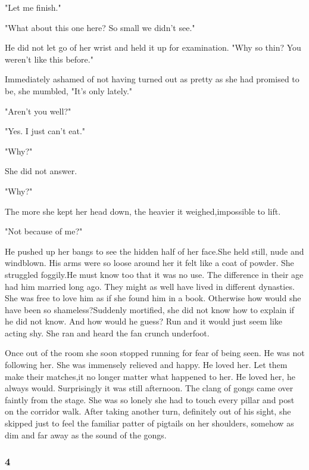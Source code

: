\par "Let me finish."
\par "What about this one here? So small we didn't see."
\par He did not let go of her wrist and held it up for examination. "Why so thin? You weren't like this before."
\par Immediately ashamed of not having turned out as pretty as she had promised to be, she mumbled, "It's only lately."
\par "Aren't you well?"
\par "Yes. I just can't eat."
\par "Why?"
\par She did not answer.
\par "Why?"
\par The more she kept her head down, the heavier it weighed,impossible to lift.
\par "Not because of me?"
\par He pushed up her bangs to see the hidden half of her face.She held still, nude and windblown. His arms were so loose around her it felt like a coat of powder. She struggled foggily.He must know too that it was no use. The difference in their age had him married long ago. They might as well have lived in different dynasties. She was free to love him as if she found him in a book. Otherwise how would she have been so shameless?Suddenly mortified, she did not know how to explain if he did not know. And how would he guess? Run and it would just seem like acting shy. She ran and heard the fan crunch underfoot.
\par Once out of the room she soon stopped running for fear of being seen. He was not following her. She was immensely relieved and happy. He loved her. Let them make their matches,it no longer matter what happened to her. He loved her, he always would. Surprisingly it was still afternoon. The clang of gongs came over faintly from the stage. She was so lonely she had to touch every pillar and post on the corridor walk. After taking another turn, definitely out of his sight, she skipped just to feel the familiar patter of pigtails on her shoulders, somehow as dim and far away as the sound of the gongs.



\subsubsection*{4}

